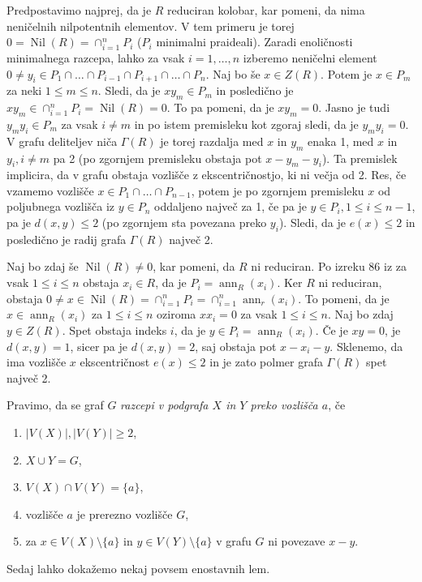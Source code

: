 \documentclass[a4paper, 12pt]{amsart}
\theoremstyle{definition} %
\theoremstyle{plain} %
\DeclareMathOperator{\ann}{ann}
\DeclareMathOperator{\nil}{Nil}
\begin{document}
Predpostavimo najprej, da je $R$ reduciran kolobar, kar pomeni, da nima neničelnih nilpotentnih elementov. V tem primeru je torej $0=\nil(R)=\cap_{i=1}^n P_i$ ($P_i$ minimalni praideali). Zaradi enoličnosti minimalnega razcepa, lahko za vsak $i=1,\dots,n$ izberemo neničelni element $0\neq y_i\in P_1 \cap\dots \cap P_{i-1}\cap P_{i+1}\cap\dots \cap P_n$. Naj bo še $x\in Z(R)$. Potem je $x\in P_m$ za neki $1\le m \le n$. Sledi, da je $xy_m\in P_m$ in posledično je $xy_m \in \cap_{i=1}^n P_i = \nil(R) = 0$. To pa pomeni, da je $xy_m = 0$. Jasno je tudi $y_m y_i\in P_m$ za vsak $i\neq m$ in po istem premisleku kot zgoraj sledi, da je $y_m y_i = 0$. V grafu deliteljev niča $\Gamma(R)$ je torej razdalja med $x$ in $y_m$ enaka 1, med $x$ in $y_i, i\neq m$ pa 2 (po zgornjem premisleku obstaja pot $x-y_m-y_i$). Ta premislek implicira, da v grafu obstaja vozlišče z ekscentričnostjo, ki ni večja od 2. Res, če vzamemo vozlišče $x\in P_1\cap \dots \cap P_{n-1}$, potem je po zgornjem premisleku $x$ od poljubnega vozlišča iz $y \in P_n$ oddaljeno največ za 1, če pa je $y\in P_i, 1 \le i \le n-1$, pa je $d(x,y) \le 2$ (po zgornjem sta povezana preko $y_i$). Sledi, da je $e(x) \le 2$ in posledično je radij grafa $\Gamma(R)$ največ 2.

Naj bo zdaj še $\nil(R)\neq 0$, kar pomeni, da $R$ ni reduciran. Po izreku 86 iz \cite{Kaplansky} za vsak $1\le i \le n$ obstaja $x_i \in R$, da je $P_i = \ann_R(x_i)$. Ker $R$ ni reduciran, obstaja $0\neq x \in \nil(R) = \cap_{i=1}^n P_i = \cap_{i=1}^n \ann_r(x_i)$. To pomeni, da je $x\in \ann_R(x_i)$ za $ 1\le i \le n$ oziroma $x x_i = 0$ za vsak $1\le i \le n$. Naj bo zdaj $y\in Z(R)$. Spet obstaja indeks $i$, da je $y\in P_i = \ann_R(x_i)$. Če je $xy =0$, je $d(x,y)=1$, sicer pa je $d(x,y) = 2$, saj obstaja pot $x - x_i - y$. Sklenemo, da ima vozlišče $x$ ekscentričnost $e(x) \le 2$ in je  zato polmer grafa $\Gamma(R)$ spet največ 2.

\endproof

Pravimo, da se graf $G$ \emph{razcepi v podgrafa $X$ in $Y$ preko vozlišča $a$}, če 
\begin{enumerate}
\item $|V(X)|,|V(Y)| \ge 2$,
\item $X\cup Y = G$,
\item $V(X) \cap V(Y) = \{a\}$,
\item vozlišče $a$ je prerezno vozlišče $G$,
\item za $x\in V(X)\setminus\{a\}$ in $y\in V(Y) \setminus \{a\}$ v grafu $G$ ni povezave $x-y$.
\end{enumerate}
Sedaj lahko dokažemo nekaj povsem enostavnih lem.
\end{document}
